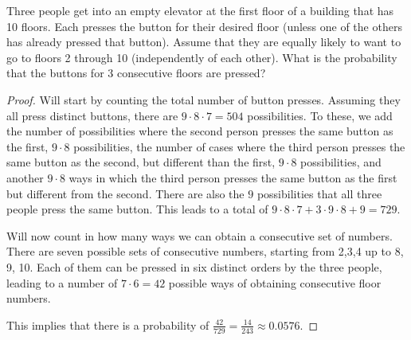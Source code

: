 \begin{exercise}{23}
Three people get into an empty elevator at the first floor of a building that has 10 floors. Each presses the button for their desired floor (unless one of the others has already pressed that button). Assume that they are equally likely to want to go to
floors 2 through 10 (independently of each other). What is the probability that the buttons for 3 consecutive floors are pressed?
\end{exercise}

\begin{proof}
    Will start by counting the total number of button presses. Assuming they all press distinct buttons, there are $9 \cdot 8 \cdot 7 = 504$ possibilities. To these, we add the number of possibilities where the second person presses the same button as the first, $9 \cdot 8$ possibilities, the number of cases where the third person presses the same button as the second, but different than the first, $9 \cdot 8$ possibilities, and another $9 \cdot 8$ ways in which the third person presses the same button as the first but different from the second. There are also the $9$ possibilities that all three people press the same button. This leads to a total of $9 \cdot 8 \cdot 7 + 3 \cdot 9 \cdot 8 + 9 = 729$.

    Will now count in how many ways we can obtain a consecutive set of numbers. There are seven possible sets of consecutive numbers, starting from 2,3,4 up to 8, 9, 10. Each of them can be pressed in six distinct orders by the three people, leading to a number of $7 \cdot 6 = 42$ possible ways of obtaining consecutive floor numbers.

    This implies that there is a probability of $\frac{42}{729} = \frac{14}{243} \approx 0.0576$.
\end{proof}



